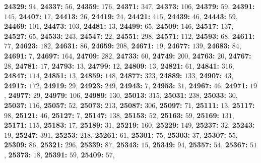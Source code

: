 \textsf{\bfseries 24329:} $94$, \textsf{\bfseries 24337:} $56$, \textsf{\bfseries 24359:} $176$, \textsf{\bfseries 24371:} $347$, \textsf{\bfseries 24373:} $106$, \textsf{\bfseries 24379:} $59$, \textsf{\bfseries 24391:} $145$, \textsf{\bfseries 24407:} $17$, \textsf{\bfseries 24413:} $26$, \textsf{\bfseries 24419:} $24$, \textsf{\bfseries 24421:} $415$, \textsf{\bfseries 24439:} $46$, \textsf{\bfseries 24443:} $59$, \textsf{\bfseries 24469:} $101$, \textsf{\bfseries 24473:} $103$, \textsf{\bfseries 24481:} $13$, \textsf{\bfseries 24499:} $65$, \textsf{\bfseries 24509:} $146$, \textsf{\bfseries 24517:} $137$, \textsf{\bfseries 24527:} $65$, \textsf{\bfseries 24533:} $243$, \textsf{\bfseries 24547:} $22$, \textsf{\bfseries 24551:} $298$, \textsf{\bfseries 24571:} $112$, \textsf{\bfseries 24593:} $68$, \textsf{\bfseries 24611:} $77$, \textsf{\bfseries 24623:} $182$, \textsf{\bfseries 24631:} $86$, \textsf{\bfseries 24659:} $208$, \textsf{\bfseries 24671:} $19$, \textsf{\bfseries 24677:} $139$, \textsf{\bfseries 24683:} $84$, \textsf{\bfseries 24691:} $7$, \textsf{\bfseries 24697:} $164$, \textsf{\bfseries 24709:} $282$, \textsf{\bfseries 24733:} $60$, \textsf{\bfseries 24749:} $200$, \textsf{\bfseries 24763:} $20$, \textsf{\bfseries 24767:} $28$, \textsf{\bfseries 24781:} $17$, \textsf{\bfseries 24793:} $13$, \textsf{\bfseries 24799:} $12$, \textsf{\bfseries 24809:} $13$, \textsf{\bfseries 24821:} $61$, \textsf{\bfseries 24841:} $316$, \textsf{\bfseries 24847:} $114$, \textsf{\bfseries 24851:} $13$, \textsf{\bfseries 24859:} $148$, \textsf{\bfseries 24877:} $323$, \textsf{\bfseries 24889:} $133$, \textsf{\bfseries 24907:} $43$, \textsf{\bfseries 24917:} $172$, \textsf{\bfseries 24919:} $29$, \textsf{\bfseries 24923:} $249$, \textsf{\bfseries 24943:} $7$, \textsf{\bfseries 24953:} $31$, \textsf{\bfseries 24967:} $46$, \textsf{\bfseries 24971:} $19$, \textsf{\bfseries 24977:} $29$, \textsf{\bfseries 24979:} $106$, \textsf{\bfseries 24989:} $130$, \textsf{\bfseries 25013:} $315$, \textsf{\bfseries 25031:} $238$, \textsf{\bfseries 25033:} $30$, \textsf{\bfseries 25037:} $116$, \textsf{\bfseries 25057:} $52$, \textsf{\bfseries 25073:} $213$, \textsf{\bfseries 25087:} $306$, \textsf{\bfseries 25097:} $71$, \textsf{\bfseries 25111:} $13$, \textsf{\bfseries 25117:} $98$, \textsf{\bfseries 25121:} $46$, \textsf{\bfseries 25127:} $7$, \textsf{\bfseries 25147:} $138$, \textsf{\bfseries 25153:} $52$, \textsf{\bfseries 25163:} $59$, \textsf{\bfseries 25169:} $131$, \textsf{\bfseries 25171:} $115$, \textsf{\bfseries 25183:} $17$, \textsf{\bfseries 25189:} $31$, \textsf{\bfseries 25219:} $160$, \textsf{\bfseries 25229:} $149$, \textsf{\bfseries 25237:} $32$, \textsf{\bfseries 25243:} $19$, \textsf{\bfseries 25247:} $391$, \textsf{\bfseries 25253:} $218$, \textsf{\bfseries 25261:} $61$, \textsf{\bfseries 25301:} $75$, \textsf{\bfseries 25303:} $37$, \textsf{\bfseries 25307:} $55$, \textsf{\bfseries 25309:} $86$, \textsf{\bfseries 25321:} $296$, \textsf{\bfseries 25339:} $87$, \textsf{\bfseries 25343:} $15$, \textsf{\bfseries 25349:} $94$, \textsf{\bfseries 25357:} $54$, \textsf{\bfseries 25367:} $51$, \textsf{\bfseries 25373:} $18$, \textsf{\bfseries 25391:} $59$, \textsf{\bfseries 25409:} $57$, 
